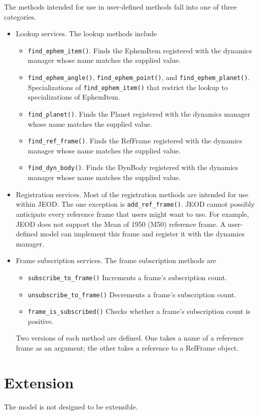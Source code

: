 The methods intended for use in user-defined methods fall into one of
three categories.\begin{itemize}
\item Lookup services.
  The lookup methods include\begin{itemize}
  \item {\tt find\_ephem\_item()}.
    Finds the EphemItem
    registered with the dynamics manager whose name matches the supplied value.
  \item {\tt find\_ephem\_angle()}, {\tt find\_ephem\_point()}, and
        {\tt find\_ephem\_planet()}.
    Specializations of \verb+find_ephem_item()+
    that restrict the lookup to specializations of EphemItem.
  \item {\tt find\_planet()}.
    Finds the Planet
    registered with the dynamics manager whose name matches the supplied value.
  \item {\tt find\_ref\_frame()}.
    Finds the RefFrame
    registered with the dynamics manager whose name matches the supplied value.
  \item {\tt find\_dyn\_body()}.
    Finds the DynBody
    registered with the dynamics manager whose name matches the supplied value.
  \end{itemize}
\item Registration services. Most of the registration methods are intended
  for use within JEOD. The one exception is \verb+add_ref_frame()+.
  JEOD cannot possibly anticipate every reference frame that users might
  want to use. For example, JEOD does not support the Mean of 1950 (M50)
  reference frame. A user-defined model can implement this frame and
  register it with the dynamics manager.
\item Frame subscription services.
  The frame subscription methods are\begin{itemize}
  \item {\tt subscribe\_to\_frame()}
    Increments a frame's subscription count.
  \item {\tt unsubscribe\_to\_frame()}
    Decrements a frame's subscription count.
  \item {\tt frame\_is\_subscribed()}
    Checks whether a frame's subscription count is positive.
  \end{itemize}
  Two versions of each method are defined. One takes a name of a reference
  frame as an argument; the other takes a reference to a RefFrame object.
\end{itemize}

\section{Extension}
The model is not designed to be extensible.